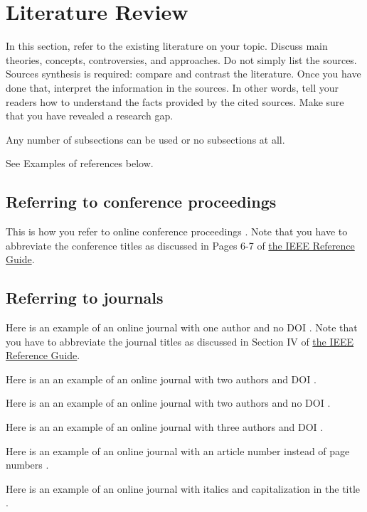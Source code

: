 \documentclass[oneside,final,12pt,a4paper]{extreport}
\begin{document}
\section{Literature Review}
In this section, refer to the existing literature on your topic. Discuss main theories, concepts, controversies, and approaches. Do not simply list the sources. Sources synthesis is required: compare and contrast the literature. Once you have done that, interpret the information in the sources. In other words, tell your readers how to understand the facts provided by the cited sources. Make sure that you have revealed a research gap.

Any number of subsections can be used or no subsections at all.

See Examples of references below.
\subsection{Referring to conference proceedings}
\label{sec:subsection1}

This is how you refer to online conference proceedings \cite{FosterEtAl:2003}. Note that you have to abbreviate the conference titles as discussed in Pages 6-7 of \href{https://journals.ieeeauthorcenter.ieee.org/wp-content/uploads/sites/7/IEEE_Reference_Guide.pdf}{the IEEE Reference Guide}.

\subsection{Referring to journals}
\label{sec:subsection2}

Here is an example of an online journal with one author and no DOI \cite{Poock2002GraduateSO}. Note that you have to abbreviate the journal titles as discussed in Section IV of \href{https://journals.ieeeauthorcenter.ieee.org/wp-content/uploads/sites/7/IEEE_Reference_Guide.pdf}{the IEEE Reference Guide}.

Here is an an example of an online journal with two authors and DOI \cite{Hullinger2014STUDENTAE}.

Here is an an example of an online journal with two authors and no DOI \cite{Oswalt2007WhatTD}.

Here is an an example of an online journal with three authors and DOI \cite{PARK2022144}.

Here is an example of an online journal with an article number instead of page numbers \cite{HERNANDEZRUIZ2022101953}.

Here is an example of an online journal with italics and capitalization in the title \cite{BAKHRIANSYAH2022101114}.
\end{document}
